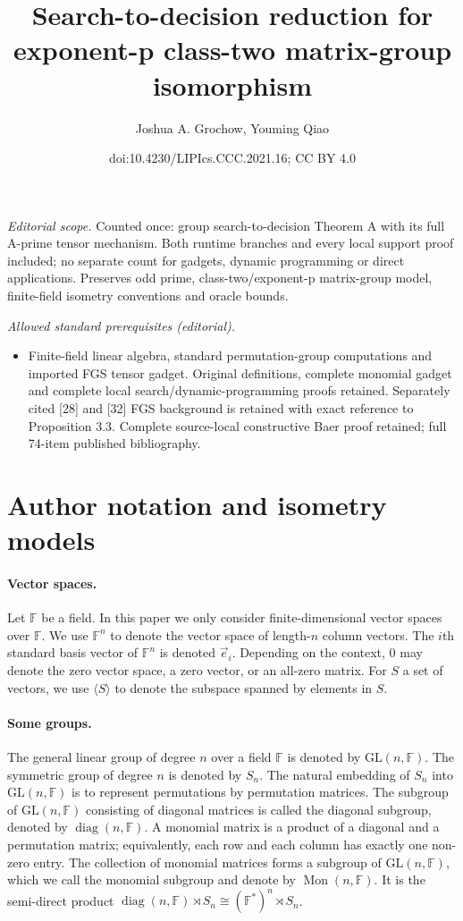 \documentclass[10pt,a4paper]{article}
\title{Search-to-decision reduction for exponent-p class-two matrix-group isomorphism}
\author{Joshua A. Grochow, Youming Qiao}
\date{doi:10.4230/LIPIcs.CCC.2021.16; CC BY 4.0}
\begin{document}
\maketitle
\noindent\textit{Editorial scope.} Counted once: group search-to-decision Theorem A with its full A-prime tensor mechanism. Both runtime branches and every local support proof included; no separate count for gadgets, dynamic programming or direct applications. Preserves odd prime, class-two/exponent-p matrix-group model, finite-field isometry conventions and oracle bounds.\par\medskip
\noindent\textit{Allowed standard prerequisites (editorial).}\begin{itemize}
\item Finite-field linear algebra, standard permutation-group computations and imported FGS tensor gadget. Original definitions, complete monomial gadget and complete local search/dynamic-programming proofs retained. Separately cited [28] and [32] FGS background is retained with exact reference to Proposition 3.3. Complete source-local constructive Baer proof retained; full 74-item published bibliography.
\end{itemize}\medskip
\section*{Author notation and isometry models}
\paragraph{Vector spaces.} Let $\mathbb F$ be a field. In this paper we only consider finite-dimensional vector spaces over $\mathbb F$. We use $\mathbb F^n$ to denote the vector space of length-$n$ column vectors. The $i$th standard basis vector of $\mathbb F^n$ is denoted $\vec e_i$. Depending on the context, 0 may denote the zero vector space, a zero vector, or an all-zero matrix. For $S$ a set of vectors, we use $\langle S\rangle$ to denote the subspace spanned by elements in $S$.
\paragraph{Some groups.} The general linear group of degree $n$ over a field $\mathbb F$ is denoted by $\mathrm{GL}(n,\mathbb F)$. The symmetric group of degree $n$ is denoted by $S_n$. The natural embedding of $S_n$ into $\mathrm{GL}(n,\mathbb F)$ is to represent permutations by permutation matrices. The subgroup of $\mathrm{GL}(n,\mathbb F)$ consisting of diagonal matrices is called the diagonal subgroup, denoted by $\operatorname{diag}(n,\mathbb F)$. A monomial matrix is a product of a diagonal and a permutation matrix; equivalently, each row and each column has exactly one non-zero entry. The collection of monomial matrices forms a subgroup of $\mathrm{GL}(n,\mathbb F)$, which we call the monomial subgroup and denote by $\operatorname{Mon}(n,\mathbb F)$. It is the semi-direct product $\operatorname{diag}(n,\mathbb F)\rtimes S_n\cong(\mathbb F^*)^n\rtimes S_n$.
\end{document}

